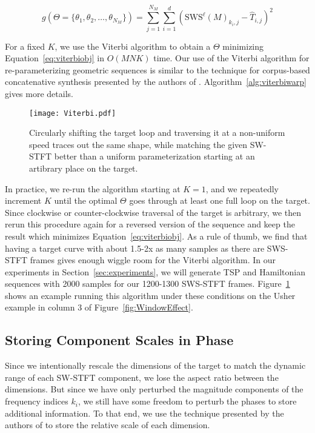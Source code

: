 \documentclass[runningheads]{llncs}
\begin{document}
\begin{equation}
  \label{eq:viterbiobj}
  g(\Theta = \{\theta_1, \theta_2, \hdots, \theta_{N_M}\}) = \sum_{j = 1}^{N_M} \sum_{i=1}^d \left( \text{SWS}^{\ell} (M)_{k_i, j} - \hat{T}_{i, j}  \right)^2
\end{equation}

For a fixed $K$, we use the Viterbi algorithm to obtain a $\Theta$ minimizing Equation~\ref{eq:viterbiobj} in $O(MNK)$ time.  Our use of the Viterbi algorithm for re-parameterizing geometric sequences is similar to the technique for corpus-based concatenative synthesis presented by the authors of \cite{schwarz2007corpus}.  Algorithm~\ref{alg:viterbiwarp} gives more details.  

\begin{figure}
  \centering
  \texttt{[image: Viterbi.pdf]}
  \caption{Circularly shifting the target loop and traversing it at a non-uniform speed traces out the same shape, while matching the given SW-STFT better than a uniform parameterization starting at an artibrary place on the target.}
  \label{fig:ViterbiWarp}
\end{figure}

In practice, we re-run the algorithm starting at $K = 1$, and we repeatedly increment $K$ until the optimal $\Theta$ goes through at least one full loop on the target.  Since clockwise or counter-clockwise traversal of the target is arbitrary, we then rerun this procedure again for a reversed version of the sequence and keep the result which minimizes Equation~\ref{eq:viterbiobj}.  As a rule of thumb, we find that having a target curve with about 1.5-2x as many samples as there are SWS-STFT frames gives enough wiggle room for the Viterbi algorithm.  In our experiments in Section~\ref{sec:experiments}, we will generate TSP and Hamiltonian sequences with 2000 samples for our 1200-1300 SWS-STFT frames.  Figure~\ref{fig:ViterbiWarp} shows an example running this algorithm under these conditions on the Usher example in column 3 of Figure~\ref{fig:WindowEffect}.







\subsection{Storing Component Scales in Phase}
\label{sec:componentscales}

Since we intentionally rescale the dimensions of the target to match the dynamic range of each SW-STFT component, we lose the aspect ratio between the dimensions.  But since we have only perturbed the magnitude components of the frequency indices $k_i$, we still have some freedom to perturb the phases to store additional information.  To that end, we use the technique presented by the authors of \cite{xiaoxiao_dong_data_2004} to store the relative scale of each dimension.  
\end{document}
